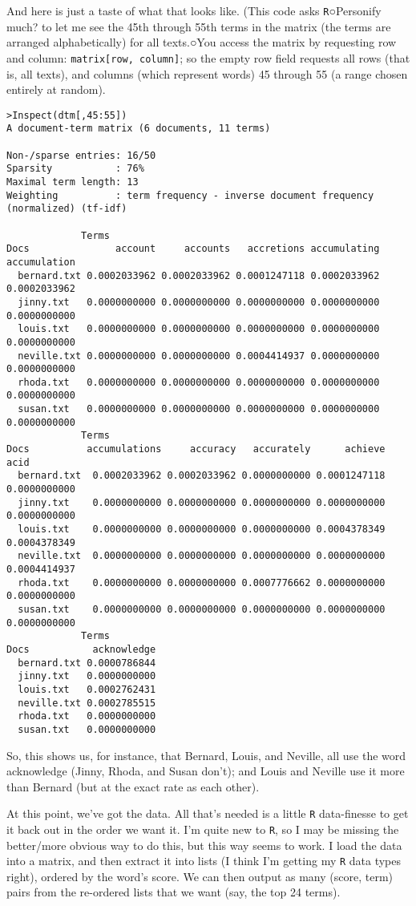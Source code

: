 \documentclass[
  12pt,
]{article}
\begin{document}
And here is just a taste of what that looks like. (This code asks
\texttt{R}○{Personify much?} to let me see the 45th through 55th terms
in the matrix (the terms are arranged alphabetically) for all texts.○You
access the matrix by requesting row and column:
\texttt{matrix{[}row,\ column{]}}; so the empty row field requests all
rows (that is, all texts), and columns (which represent words) 45
through 55 (a range chosen entirely at random).

\begin{verbatim}
>Inspect(dtm[,45:55])
A document-term matrix (6 documents, 11 terms)

Non-/sparse entries: 16/50
Sparsity           : 76%
Maximal term length: 13 
Weighting          : term frequency - inverse document frequency (normalized) (tf-idf)

             Terms
Docs               account     accounts   accretions accumulating accumulation
  bernard.txt 0.0002033962 0.0002033962 0.0001247118 0.0002033962 0.0002033962
  jinny.txt   0.0000000000 0.0000000000 0.0000000000 0.0000000000 0.0000000000
  louis.txt   0.0000000000 0.0000000000 0.0000000000 0.0000000000 0.0000000000
  neville.txt 0.0000000000 0.0000000000 0.0004414937 0.0000000000 0.0000000000
  rhoda.txt   0.0000000000 0.0000000000 0.0000000000 0.0000000000 0.0000000000
  susan.txt   0.0000000000 0.0000000000 0.0000000000 0.0000000000 0.0000000000
             Terms
Docs          accumulations     accuracy   accurately      achieve         acid
  bernard.txt  0.0002033962 0.0002033962 0.0000000000 0.0001247118 0.0000000000
  jinny.txt    0.0000000000 0.0000000000 0.0000000000 0.0000000000 0.0000000000
  louis.txt    0.0000000000 0.0000000000 0.0000000000 0.0004378349 0.0004378349
  neville.txt  0.0000000000 0.0000000000 0.0000000000 0.0000000000 0.0004414937
  rhoda.txt    0.0000000000 0.0000000000 0.0007776662 0.0000000000 0.0000000000
  susan.txt    0.0000000000 0.0000000000 0.0000000000 0.0000000000 0.0000000000
             Terms
Docs           acknowledge
  bernard.txt 0.0000786844
  jinny.txt   0.0000000000
  louis.txt   0.0002762431
  neville.txt 0.0002785515
  rhoda.txt   0.0000000000
  susan.txt   0.0000000000
\end{verbatim}

So, this shows us, for instance, that Bernard, Louis, and Neville, all
use the word acknowledge (Jinny, Rhoda, and Susan don't); and Louis and
Neville use it more than Bernard (but at the exact rate as each other).

At this point, we've got the data. All that's needed is a little
\texttt{R} data-finesse to get it back out in the order we want it. I'm
quite new to \texttt{R}, so I may be missing the better/more obvious way
to do this, but this way seems to work. I load the data into a matrix,
and then extract it into lists (I think I'm getting my \texttt{R} data
types right), ordered by the word's score. We can then output as many
(score, term) pairs from the re-ordered lists that we want (say, the top
24 terms).
\end{document}
